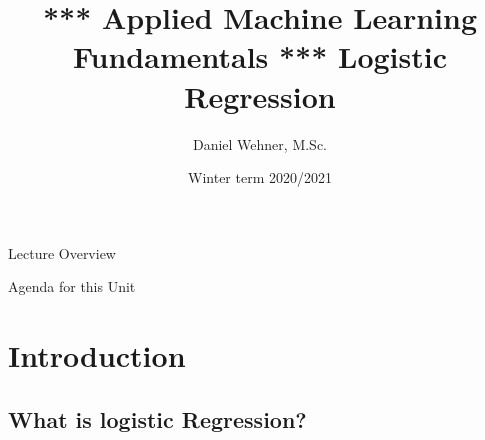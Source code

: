 


\title[Principal Component Analysis]{*** Applied Machine Learning Fundamentals *** Logistic Regression}
\author{Daniel Wehner, M.Sc.}
\date{Winter term 2020/2021}




\maketitlepage


\begin{frame}{Lecture Overview}{}
\end{frame}


\begin{frame}{Agenda for this Unit}
	\begin{multicols}{2}
		\tableofcontents
	\end{multicols}
\end{frame}


\section{Introduction}

\subsection{What is logistic Regression?}


